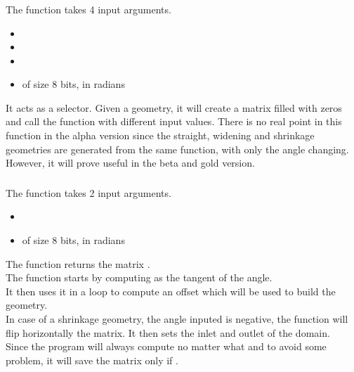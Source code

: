 \subsubsection{\textcolor{func}{}}
The function \textcolor{func}{} takes 4 input arguments.
\begin{itemize}
      \item {}
      \item {}
      \item {}
      \item {} of size 8 bits, in radians
\end{itemize}
It acts as a selector. Given a geometry, it will create a matrix  filled
with zeros and call the function \textcolor{func}{} with different input
values. There is no real point in this function in the alpha version since the
straight, widening and shrinkage geometries are generated from the same
function, with only the angle changing. However, it will prove useful in the
beta and gold version.

\subsubsection{\textcolor{func}{}}
The function \textcolor{func}{} takes 2 input arguments.
\begin{itemize}
      \item {} \textcolor{dtype}{}
      \item {} of size 8 bits, in radians
\end{itemize}
The function returns the matrix .\\
The function starts by computing  as the tangent of the angle.\\
It then uses it in a  loop to compute an offset which will be used to
build the geometry.\\
In case of a shrinkage geometry, the angle inputed is negative, the function
will flip horizontally the matrix. It then sets the inlet and outlet of the
domain.\\
Since the program will always compute  no matter what and to avoid some
problem, it will save the matrix only if .

